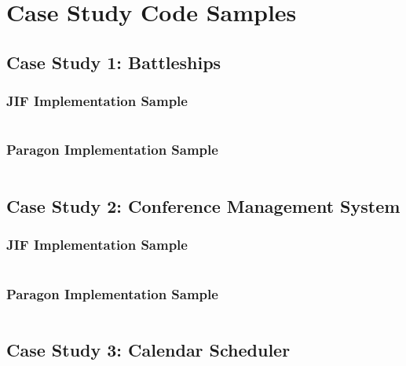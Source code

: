 \chapter{Case Study Code Samples}

\clearpage

\section{Case Study 1: Battleships}

\subsection{JIF Implementation Sample} \label{appendix_bs_jif}

\inputminted{java}{content/code_sections/case_studies/bs_printout.jif}

\clearpage

\subsection{Paragon Implementation Sample} \label{appendix_bs_para}

\inputminted{java}{content/code_sections/case_studies/bs_printout.para}

\clearpage

\section{Case Study 2: Conference Management System}

\subsection{JIF Implementation Sample} \label{appendix_conf_jif}

\inputminted{java}{content/code_sections/case_studies/conf_printout.jif}

\clearpage

\subsection{Paragon Implementation Sample} \label{appendix_conf_para}

\inputminted{java}{content/code_sections/case_studies/conf_printout.para}

\clearpage

\section{Case Study 3: Calendar Scheduler}

